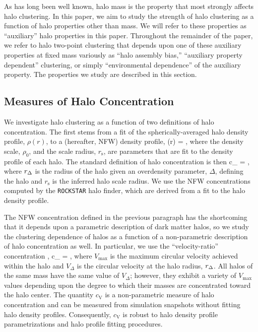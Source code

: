 \documentclass[usenatbib,fleqn]{mnras}
\begin{document}
As has long been well known, halo mass is the property that most strongly affects halo clustering. In this paper, we aim to study the strength of halo clustering as a function of halo properties other than mass. We will refer to these properties as ``auxiliary'' halo properties in this paper. Throughout the remainder of the paper, we refer to halo two-point clustering that depends upon one of these auxiliary properties at fixed mass variously as ``halo assembly bias,'' ``auxiliary property dependent'' clustering, or simply ``environmental dependence'' of the auxiliary property. The properties we study are described in this section.

\subsection{Measures of Halo Concentration}

We investigate halo clustering as a function of two definitions of halo concentration. The first stems from a fit of the spherically-averaged halo density profile, $\rho(r)$, to a \citet{navarro_etal97} (hereafter, NFW) density profile, 
%
\beq
\rho(r) = ,
\eeq
%
where the density scale, $\rho_0$, and the scale radius, $r_{\mathrm{s}}$, are parameters that are fit to the density profile of each halo. The standard definition of halo concentration is then 
\beq
c_{} = ,
\eeq
where $r_{\Delta}$ is the radius of the halo given an overdensity parameter, $\Delta$, defining the halo and $r_{\mathrm{s}}$ is the inferred halo scale radius. We use the NFW concentrations computed by the {\tt ROCKSTAR} halo finder, which are derived from a fit to the halo density profile.  


The NFW concentration defined in the previous paragraph has the shortcoming that it 
depends upon a parametric description of dark matter halos, so we study the clustering dependence of halos as a function of a non-parametric description of halo concentration as well. In particular, we use the ``velocity-ratio'' concentration \citep{prada_etal12,klypin_etal16},
\beq
c_{} = , 
\eeq
where $V_{\mathrm{max}}$ is the maximum circular velocity achieved within the halo and $V_{\Delta}$ is the circular velocity at the halo radius, $r_{\Delta}$. All halos of the same mass have the same value of $V_{\Delta}$; however, 
they exhibit a variety of $V_{\mathrm{max}}$ values depending upon the degree to which their masses are concentrated toward the halo center. The quantity $c_{\mathrm{V}}$ is a non-parametric measure of halo concentration and can be measured from simulation snapshots without fitting halo density profiles. Consequently, $c_{\mathrm{V}}$ is robust to halo density profile parametrizations and halo profile fitting procedures. 
\end{document}

